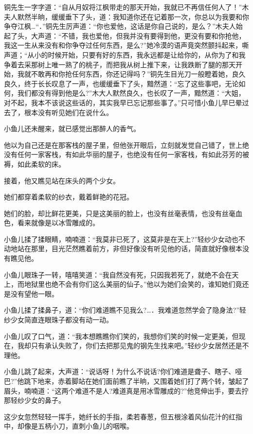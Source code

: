 \documentclass[12pt,oneside]{book}
\begin{document}
铜先生一字字道：``自从月奴将江枫带走的那天开始，我就已不再信任何人了！''木夫人默然半晌，缓缓垂下了头，道：我知道你还在记着那一次，你总以为我要和你争夺江枫\ldots{}``．''铜先生厉声道：``你也爱他，这话是你自己说的，是么？''木夫人始起了头，大声道：``不错，我也爱他，但我并没有要得到他，更没有要和你抢他，我这一生从来没有和你争夺过任何东西，是么?''她冷漠的语声竟突然颤抖起来，嘶声道；``从小的时候开始，只要有好的东西，我永远都是让给你的，从你为了和我争着去采那树上唯一熟了的桃子，而把我从树上推下来，让我跌断了腿的那天开始，我就不敢再和你抢任何东西，你还记得吗？''铜先生目光刀一般瞪着她，良久良久，终于长长叹息了一声，也缓缓垂下了头，黯然道：``忘了这些事吧，无论如何，我们都没有得到他是么?''木大人默然良久，也长叹了一声，黯然道：``大姐，对不起，我本不该说这些话的，其实我早已忘记那些事了。''只可惜小鱼儿早巳晕过去了，根本没有听见她们在说什么。

小鱼儿还未醒来，就已感觉出那醉人的香气。

他以为自己还是在那客栈的屋子里，但他张开眼后，立刻就发觉自己错了，世上绝没有任何一家客栈，有如此华丽的屋子，也绝没有任何一家客栈，有如此芬芳的被褥，如此柔软的床。

接着，他又瞧见站在床头的两个少女。

她们都穿着柔软的纱衣，戴着鲜艳的花冠。

她们的脸，却比鲜花更美，只是这美丽的脸上，也没有丝毫表情，也没有丝毫血色，看来就像是以冰雪雕成的。

小鱼儿揉了揉眼睛，喃喃道：``我莫非已死了，这莫非是在天上?''轻纱少女动也不动地站在那里，目光茫然瞧着前方，非但好像没有听见他的话，简直就好像根本没有瞧见他。

小鱼儿眼珠子一转，嘻嘻笑道：``我自然没有死，只因我若死了，就绝不会在天上，而地狱里也绝不会有你们这么美丽的仙子。''他以为她们会笑的，谁知她们竟还是没有望他一眼。

小鱼儿揉了揉鼻子，道：``你们难道瞧不见我么?\ldots．我难道忽然学会了隐身法?''轻纱少女简直连眼珠子都没有动一动。

小鱼儿叹了口气，道：``我本想瞧瞧你们笑的，我想你们笑的时候一定更美，但现在，我却只有承认失败了，你们去把那见鬼的钢先生找来吧。''轻纱少女居然还是不理他。

小鱼儿跳了起来，大声道：``说话呀！为什么不说话?你们难道是聋子、瞎子、哑巴?''他跳下地来，赤着脚站在她们面前瞧了半晌，又围着她们打了两个转，皱起了眉头，喃喃道：``这两个难道不是人?难道真是用冰雪雕成的?''他竞伸出手，要去拧那轻纱少女的鼻子。

这少女忽然轻轻一挥手，她纤长的手指，柔若春葱，但五根涂着风仙花汁的红指中，却像是五柄小刀，直刺小鱼儿的咽喉。
\end{document}

